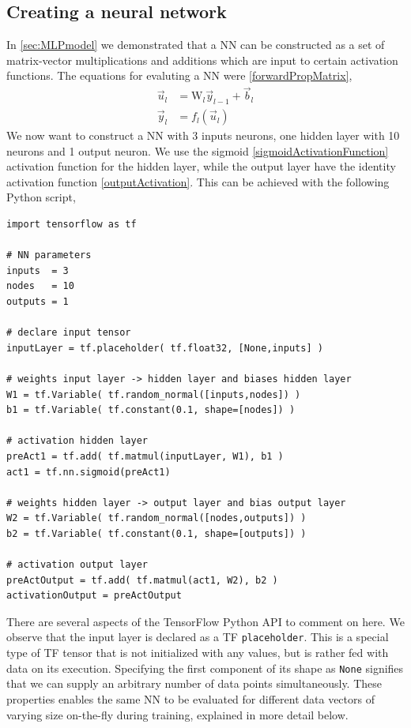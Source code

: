 \documentclass[twoside,english]{uiofysmaster}
\begin{document}
\subsection{Creating a neural network} \label{sec:TensorFlowCreatingNN}
In \autoref{sec:MLPmodel} we demonstrated that a NN can be constructed 
as a set of matrix-vector multiplications and additions which are input to certain activation functions. 
The equations for evaluting a NN were \eqref{forwardPropMatrix},
\begin{subequations}
 \begin{align}
  \vec{u}_l &= \mathrm{W}_l\vec{y}_{l-1} + \vec{b}_l \label{preActivation2} \\
  \vec{y}_l &= f_l(\vec{u}_l) \label{activation2}
 \end{align}
\end{subequations}
We now want to construct a NN with 3 inputs neurons, one hidden layer with 10 neurons and 1 output neuron. 
We use the sigmoid \eqref{sigmoidActivationFunction} activation function for the hidden layer, while 
the output layer have the identity activation function \eqref{outputActivation}.
This can be achieved with the following Python script,
\begin{verbatim}
import tensorflow as tf

# NN parameters
inputs  = 3
nodes   = 10
outputs = 1

# declare input tensor
inputLayer = tf.placeholder( tf.float32, [None,inputs] )

# weights input layer -> hidden layer and biases hidden layer
W1 = tf.Variable( tf.random_normal([inputs,nodes]) )
b1 = tf.Variable( tf.constant(0.1, shape=[nodes]) )

# activation hidden layer
preAct1 = tf.add( tf.matmul(inputLayer, W1), b1 ) 
act1 = tf.nn.sigmoid(preAct1)

# weights hidden layer -> output layer and bias output layer
W2 = tf.Variable( tf.random_normal([nodes,outputs]) )
b2 = tf.Variable( tf.constant(0.1, shape=[outputs]) )

# activation output layer
preActOutput = tf.add( tf.matmul(act1, W2), b2 ) 
activationOutput = preActOutput
\end{verbatim}
There are several aspects of the TensorFlow Python API to comment on here. 
We observe that the input layer is declared as a TF \texttt{placeholder}. This is a special
type of TF tensor that is not initialized with any values, but is rather fed with data on its execution.
Specifying the first component of its shape as \texttt{None} signifies that we can supply an arbitrary 
number of data points simultaneously.
These properties enables the same NN to be evaluated for different data vectors of varying size on-the-fly during training, 
explained in more detail below. 
\end{document}
